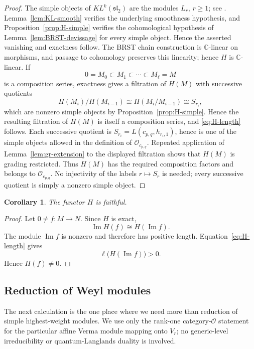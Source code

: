 \documentclass[12pt,leqno]{amsart}
\numberwithin{equation}{section}
\newtheorem{cor}[thm]{Corollary}
\newcommand{\KL}{KL}
\newcommand{\Oc}{\mathcal O}
\def\C{\mathbb{C}}
\begin{document}
\begin{proof}
The simple objects of $\KL^k(\mathfrak{sl}_2)$ are the modules
$L_r$, $r\ge1$; see \cite[Section~2.2, in particular
Theorem~2.2]{McRaeYang}.  Lemma~\ref{lem:KL-smooth} verifies the underlying smoothness hypothesis,
and Proposition~\ref{prop:H-simple} verifies the cohomological hypothesis of
Lemma~\ref{lem:BRST-devissage} for every simple object.  Hence the asserted
vanishing and exactness follow.  The BRST chain
construction is $\C$-linear on morphisms, and passage to cohomology
preserves this linearity; hence $H$ is $\C$-linear.  If
\[
 0=M_0\subset M_1\subset\cdots\subset M_\ell=M
\]
is a composition series, exactness gives a filtration of $H(M)$ with
successive quotients
\[
 H(M_i)/H(M_{i-1})\cong H(M_i/M_{i-1})\cong S_{r_i},
\]
which are nonzero simple objects by Proposition~\ref{prop:H-simple}.
Hence the resulting filtration of $H(M)$ is itself a composition series,
and \eqref{eq:H-length} follows.  Each successive quotient is
$S_{r_i}=L(c_{p,q},h_{r_i,1})$, hence is one of the simple objects allowed
in the definition of $\Oc_{c_{p,q}}$.  Repeated application of
Lemma~\ref{lem:gr-extension} to the displayed filtration shows that
$H(M)$ is grading restricted.  Thus $H(M)$ has the required composition
factors and belongs to $\Oc_{c_{p,q}}$.  No injectivity of the labels $r\mapsto S_r$ is
needed; every successive quotient is simply a nonzero simple object.
\end{proof}

\begin{cor}\label{cor:H-faithful}
The functor $H$ is faithful.
\end{cor}

\begin{proof}
Let $0\neq f:M\to N$.  Since $H$ is exact,
\[
 \operatorname{Im}H(f)\cong H(\operatorname{Im}f).
\]
The module $\operatorname{Im}f$ is nonzero and therefore has positive
length.  Equation~\eqref{eq:H-length} gives
\[
 \ell\bigl(H(\operatorname{Im}f)\bigr)>0.
\]
Hence $H(f)\neq0$.
\end{proof}

\subsection{Reduction of Weyl modules}

The next calculation is the one place where we need more than reduction of
simple highest-weight modules.  We use only the rank-one category-$\mathcal O$
statement for the particular affine Verma module mapping onto $V_r$; no
generic-level irreducibility or quantum-Langlands duality is involved.
\end{document}
